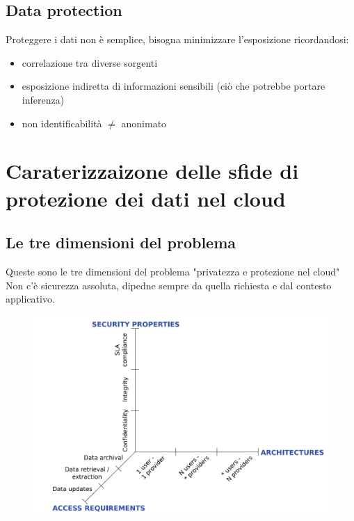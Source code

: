 \documentclass{report}
\begin{document}
\section{Data protection}
Proteggere i dati non è semplice, bisogna minimizzare l'esposizione ricordandosi:
\begin{itemize}
    \item correlazione tra diverse sorgenti
    \item esposizione indiretta di informazioni sensibili (ciò che potrebbe portare inferenza)
    \item non identificabilità $ \neq $ anonimato
\end{itemize}

\chapter{Caraterizzaizone delle sfide di protezione dei dati nel cloud}
\section{Le tre dimensioni del problema}
Queste sono le tre dimensioni del problema "privatezza e protezione nel cloud"
Non c'è sicurezza assoluta, dipedne sempre da quella richiesta e dal contesto applicativo.
\begin{figure}[ht]
    \centering
    \includegraphics[width=1\linewidth]{images/3 dimensioni.png}
\end{figure}
\end{document}
